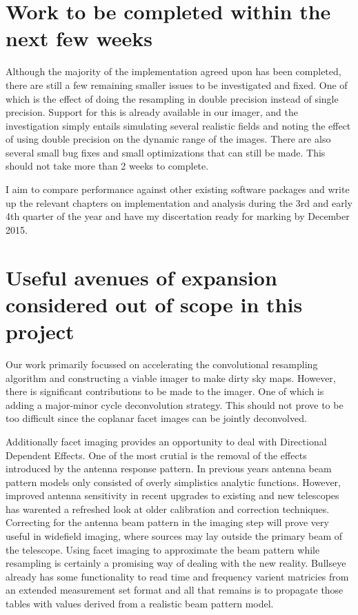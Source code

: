 \documentclass[a4paper,10pt]{article}
\begin{document}
\section{Work to be completed within the next few weeks}
Although the majority of the implementation agreed upon has been completed, there are still a few remaining smaller issues to be investigated and fixed. One of which is
the effect of doing the resampling in double precision instead of single precision. Support for this is already available in our imager, and the investigation simply entails
simulating several realistic fields and noting the effect of using double precision on the dynamic range of the images. There are also several small bug fixes and small 
optimizations that can still be made. This should not take more than 2 weeks to complete.

I aim to compare performance against other existing software packages and write up the relevant chapters on implementation and analysis during the 3rd and early 4th quarter
of the year and have my discertation ready for marking by December 2015. 
\section{Useful avenues of expansion considered out of scope in this project}
Our work primarily focussed on accelerating the convolutional resampling algorithm and constructing a viable imager to make dirty sky maps. However, there is significant
contributions to be made to the imager. One of which is adding a major-minor cycle deconvolution strategy. This should not prove to be too difficult since
the coplanar facet images can be jointly deconvolved.

Additionally facet imaging provides an opportunity to deal with Directional Dependent Effects. One of the most crutial is the removal of the effects introduced by the antenna
response pattern. In previous years antenna beam pattern models only consisted of overly simplistics analytic functions. However, improved antenna sensitivity in recent upgrades to
existing and new telescopes has warented a refreshed look at older calibration and correction techniques. Correcting for the antenna beam pattern in the imaging step will prove very
useful in widefield imaging, where sources may lay outside the primary beam of the telescope. Using facet imaging to approximate the beam pattern while resampling is certainly a promising
way of dealing with the new reality. Bullseye already has some functionality to read time and frequency varient matricies from an extended measurement set format and all that remains is to
propagate those tables with values derived from a realistic beam pattern model.
\pagebreak
{}

\end{document}
